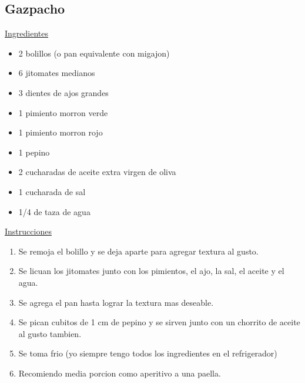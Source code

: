 \subsection{Gazpacho}

\underline{Ingredientes}

\begin{itemize}
\item 2 bolillos (o pan equivalente con migajon)
\item 6 jitomates medianos
\item 3 dientes de ajos grandes
\item 1 pimiento morron verde
\item 1 pimiento morron rojo
\item 1 pepino
\item 2 cucharadas de aceite extra virgen de oliva
\item 1 cucharada de sal
\item 1/4 de taza de agua
\end{itemize}

\underline{Instrucciones}

\begin{enumerate}
\item Se remoja el bolillo y se deja aparte para agregar textura al gusto.
\item Se licuan los jitomates junto con los pimientos, el ajo, la sal, el aceite y el agua.
\item Se agrega el pan hasta lograr la textura mas deseable.
\item Se pican cubitos de 1 cm de pepino y se sirven junto con un chorrito de aceite al gusto tambien.
\item Se toma frio (yo siempre tengo todos los ingredientes en el refrigerador)
\item Recomiendo media porcion como aperitivo a una paella. 
\end{enumerate}
